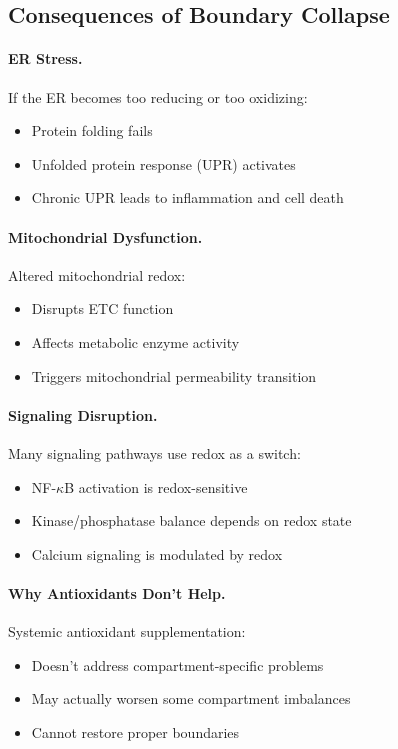 \subsection{Consequences of Boundary Collapse}

\paragraph{ER Stress.} If the ER becomes too reducing or too oxidizing:
\begin{itemize}
    \item Protein folding fails
    \item Unfolded protein response (UPR) activates
    \item Chronic UPR leads to inflammation and cell death
\end{itemize}

\paragraph{Mitochondrial Dysfunction.} Altered mitochondrial redox:
\begin{itemize}
    \item Disrupts ETC function
    \item Affects metabolic enzyme activity
    \item Triggers mitochondrial permeability transition
\end{itemize}

\paragraph{Signaling Disruption.} Many signaling pathways use redox as a switch:
\begin{itemize}
    \item NF-$\kappa$B activation is redox-sensitive
    \item Kinase/phosphatase balance depends on redox state
    \item Calcium signaling is modulated by redox
\end{itemize}

\paragraph{Why Antioxidants Don't Help.} Systemic antioxidant supplementation:
\begin{itemize}
    \item Doesn't address compartment-specific problems
    \item May actually worsen some compartment imbalances
    \item Cannot restore proper boundaries
\end{itemize}

